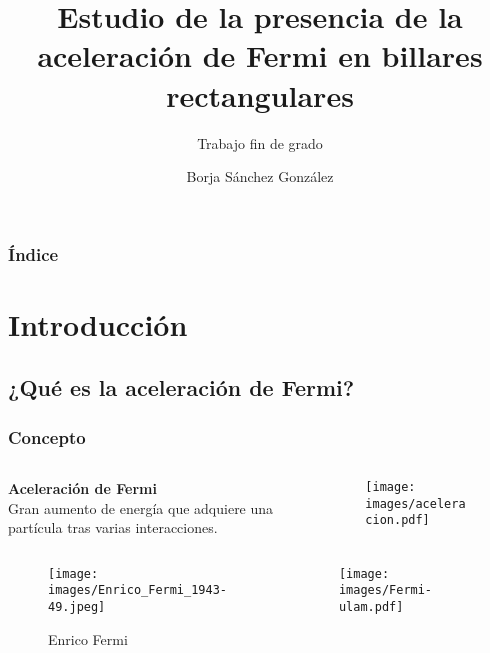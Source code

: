 \documentclass{beamer}
\title{Estudio de la presencia de la aceleración de Fermi en billares rectangulares}
\subtitle{Trabajo fin de grado}
\author{Borja Sánchez González}
\institute{Universidad Nacional de Educación a Distancia}
\date{\empty}
\begin{document}
\begin{frame}
    \titlepage%
\end{frame}

\begin{frame}
    \frametitle{Índice}
    \tableofcontents
\end{frame}

\section{Introducción}

\subsection{¿Qué es la aceleración de Fermi?}

\begin{frame}
    \frametitle[prueb1]{Concepto}
    \begin{columns}
    \begin{column}{0.5\textwidth}
        \textbf{Aceleración de Fermi}\\
        Gran aumento de energía que adquiere una partícula tras varias interacciones.
    \end{column}

    \begin{column}{0.5\textwidth}
        \begin{figure}
            \texttt{[image: images/aceleracion.pdf]}    
        \end{figure}    
    \end{column}

    \end{columns}
\end{frame}

\begin{frame}
    \begin{columns}
        \begin{column}{0.5\textwidth}
            \begin{figure}
                \centering
                \texttt{[image: images/Enrico\_Fermi\_1943-49.jpeg]}  
                \caption{Enrico Fermi}  
            \end{figure}            
        \end{column}

        \begin{column}{0.5\textwidth}
            \begin{figure}
                \centering
                \texttt{[image: images/Fermi-ulam.pdf]}  
            \end{figure}            
        \end{column}
    \end{columns}
\end{frame}
\end{document}
